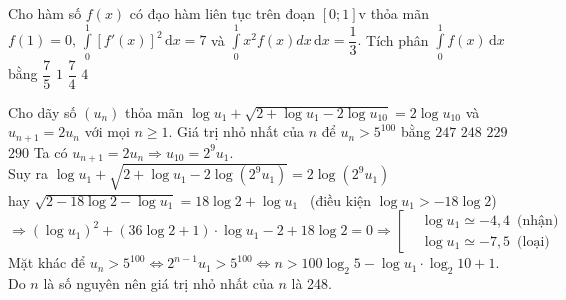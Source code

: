 \documentclass[12pt,a4paper,oneside]{article}
\newcommand{\hoac}[1]{ 
\left[\begin{aligned}#1\end{aligned}\right.}
\begin{document}
\begin{ex}
	Cho  hàm  số $f(x)$  có đạo  hàm  liên  tục  trên đoạn 
	$[0;1]$v thỏa  mãn $f(1) =0,\, \displaystyle\int\limits_{0}^{1}[f'(x)]^2 \mathrm{\, d}x = 7$ và $\displaystyle\int\limits_{0}^{1}x^2f(x) dx \mathrm{\, d}x =\dfrac{1}{3}.$ Tích phân  $\displaystyle\int\limits_{0}^{1}f(x) \mathrm{\, d}x $ bằng
	\choice
	{\True $\dfrac{7}{5}$}
	{$1$}
	{$\dfrac{7}{4}$}
	{$4$}
\end{ex}

\begin{ex}	
	Cho dãy số $ (u_n) $	thỏa mãn $ \log u_1 +\sqrt{2 + \log u_1 - 2 \log u_{10} } = 2 \log u_{10}$ và $ u_{n+1} = 2u_n $ với mọi $ n \ge 1. $ Giá trị nhỏ nhất của $ n $ để $ u_n > 5^{100} $ bằng
	\choice
	{$247$}
	{\True $248$}
	{$229$}
	{$290$}
	\loigiai
	{
		Ta có $ u_{n+1} = 2u_n \Rightarrow u_{10} =2^9 u_1.   $ \\ Suy ra $ \log u_1 +\sqrt{2 + \log u_1 -2 \log (2^9 u_1)} = 2 \log (2^9 u_1) $ \\
		hay $ \sqrt{2 - 18 \log 2 - \log u_1} = 18 \log 2 + \log u_1 $ \, (điều kiện $ \log u_1 > -18 \log 2 $) \\
		$ \Rightarrow \left(\log u_1\right)^2 + \left(36 \log 2 + 1\right) \cdot \log u_1 -2 +18 \log 2 = 0 \Rightarrow \hoac{&\log u_1 \simeq -4,4 \, \text{ (nhận)} \\&\log u_1 \simeq -7,5 \, \text{ (loại)}  } $\\
		Mặt khác để $ u_n > 5^{100}  \Leftrightarrow 2^{n-1} u_1 >5^{100} \Leftrightarrow n > 100 \log_2 5 - \log u_1 \cdot \log_2 10 + 1 $.\\
		Do $ n  $  là số nguyên nên giá trị nhỏ nhất của $ n  $ là 248.
	}
\end{ex}
\end{document}
